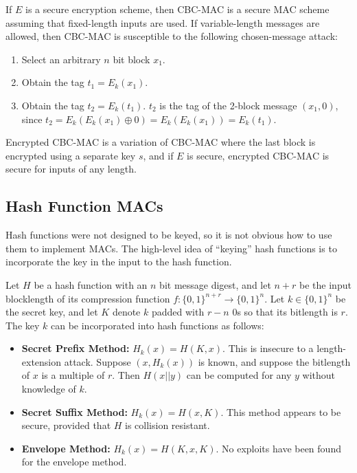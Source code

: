 \documentclass[12pt,titlepage]{article}
\begin{document}
      If $E$ is a secure encryption scheme, then CBC-MAC is a secure MAC scheme assuming that fixed-length inputs are used. If variable-length messages are allowed, then
      CBC-MAC is susceptible to the following chosen-message attack:
      \begin{enumerate}
        \item Select an arbitrary $n$ bit block $x_1$.
        \item Obtain the tag $t_1 = E_k(x_1)$.
        \item Obtain the tag $t_2 = E_k(t_1)$. $t_2$ is the tag of the 2-block message $(x_1, 0)$, since $t_2 = E_k(E_k(x_1) \oplus 0) = E_k(E_k(x_1)) = E_k(t_1)$.
      \end{enumerate}

      Encrypted CBC-MAC is a variation of CBC-MAC where the last block is encrypted using a separate key $s$, and if $E$ is secure, encrypted CBC-MAC is secure for
      inputs of any length.

    \subsection{Hash Function MACs}
      Hash functions were not designed to be keyed, so it is not obvious how to use them to implement MACs. The high-level idea of ``keying'' hash functions is to
      incorporate the key in the input to the hash function.

      Let $H$ be a hash function with an $n$ bit message digest, and let $n + r$ be the input blocklength of its compression function $f: \{0, 1\}^{n+r} \rightarrow \{0, 1\}^n$.
      Let $k \in \{0, 1\}^n$ be the secret key, and let $K$ denote $k$ padded with $r - n$ 0s so that its bitlength is $r$. The key $k$ can be incorporated into hash functions
      as follows:

      \begin{itemize}
        \item \textbf{Secret Prefix Method:} $H_k(x) = H(K, x)$. This is insecure to a length-extension attack. Suppose $(x, H_k(x))$ is known, and suppose the bitlength of $x$
          is a multiple of $r$. Then $H(x || y)$ can be computed for any $y$ without knowledge of $k$.
        \item \textbf{Secret Suffix Method:} $H_k(x) = H(x, K)$. This method appears to be secure, provided that $H$ is collision resistant.
        \item \textbf{Envelope Method:} $H_k(x) = H(K, x, K)$. No exploits have been found for the envelope method.
      \end{itemize}
\end{document}
